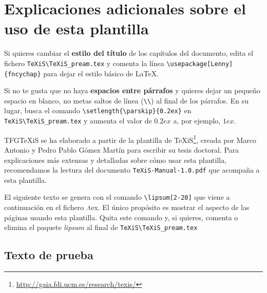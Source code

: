 \section{Explicaciones adicionales sobre el uso de esta plantilla}
Si quieres cambiar el \textbf{estilo del título} de los capítulos del documento, edita el fichero \verb|TeXiS\TeXiS_pream.tex| y comenta la línea \verb|\usepackage[Lenny]{fncychap}| para dejar el estilo básico de \LaTeX.

Si no te gusta que no haya \textbf{espacios entre párrafos} y quieres dejar un pequeño espacio en blanco, no metas saltos de línea (\verb|\\|) al final de los párrafos. En su lugar, busca el comando  \verb|\setlength{\parskip}{0.2ex}| en \verb|TeXiS\TeXiS_pream.tex| y aumenta el valor de $0.2ex$ a, por ejemplo, $1ex$.

TFGTeXiS se ha elaborado a partir de la plantilla de TeXiS\footnote{\url{http://gaia.fdi.ucm.es/research/texis/}}, creada por Marco Antonio y Pedro Pablo Gómez Martín para escribir su tesis doctoral. Para explicaciones más extensas y detalladas sobre cómo usar esta plantilla, recomendamos la lectura del documento \texttt{TeXiS-Manual-1.0.pdf} que acompaña a esta plantilla.

El siguiente texto se genera con el comando \verb|\lipsum[2-20]| que viene a continuación en el fichero .tex. El único propósito es mostrar el aspecto de las páginas usando esta plantilla. Quita este comando y, si quieres, comenta o elimina el paquete \textit{lipsum} al final de \verb|TeXiS\TeXiS_pream.tex|

\subsection{Texto de prueba}


\lipsum[2-20]